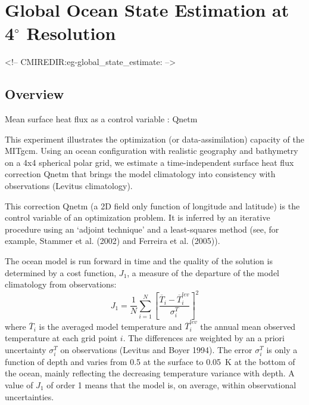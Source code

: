 
\section[Global Ocean State Estimation Example]{Global Ocean State Estimation at 4$^\circ$ Resolution}
\label{www:tutorials}
\label{sect:eg-global_state_estimate}
\begin{rawhtml}
<!-- CMIREDIR:eg-global_state_estimate: -->
\end{rawhtml}

\subsection{Overview}

Mean surface heat flux as a  control variable : Qnetm

This experiment illustrates the optimization (or data-assimilation) capacity
of the MITgcm. Using an ocean configuration with realistic geography and bathymetry on a
4x4 spherical polar grid, we estimate a time-independent surface heat flux correction
Qnetm that brings the model climatology into consistency with observations (Levitus
climatology).

This correction Qnetm (a 2D field only function of longitude and latitude) is
the control variable of an optimization problem. It is inferred by an iterative
procedure using an `adjoint technique' and a least-squares method (see, for example, 
Stammer et al. (2002) and Ferreira et al. (2005)).

The ocean model is run forward in time and the quality of the solution is
determined by a cost function, $J_1$, a measure of the departure of the model
climatology from observations:
\begin{equation}
J_1=\frac{1}{N}\sum_{i=1}^N \left[ \frac{\overline{T}_i-\overline{T}_i^{lev}}{\sigma_i^T}\right]^2
\end{equation}
where $\overline{T}_i$ is the averaged model temperature and $\overline{T}_i^{lev}$
the annual mean observed temperature at each grid point $i$. The differences
are weighted by an a priori uncertainty $\sigma_i^T$ on observations (Levitus
and Boyer 1994). The error $\sigma_i^T$ is only a function of depth and varies
from 0.5 at the surface to 0.05~K at the bottom of the ocean, mainly reflecting
the decreasing temperature variance with depth. A value of $J_1$ of order 1 means
that the model is, on average, within observational uncertainties.

